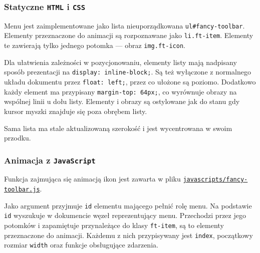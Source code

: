 \documentclass[10pt,a4paper]{article}
\newcommand{\f}[1]{\texttt{#1}}
\newcommand{\rev}{3b28a62c26319a36333406057e962ccbe1d4a198}
\newcommand{\revhref}[1] {\href{https://github.com/student-tomasz/pi-cwiczenie-2/blob/\rev/#1}{\f{#1}}}
\begin{document}
\subsubsection{Statyczne \f{HTML} i \f{CSS}}
Menu jest zaimplementowane jako lista nieuporządkowana \f{ul\#fancy-toolbar}.
Elementy przeznaczone do animacji są rozpoznawane jako \f{li.ft-item}. Elementy
te zawierają tylko jednego potomka --- obraz \f{img.ft-icon}.

Dla ułatwienia zależności w pozycjonowaniu, elementy listy mają nadpisany sposób
prezentacji na \f{display: inline-block;}. Są też wyłączone z normalnego układu
dokumentu przez \f{float: left;}, przez co ułożone są poziomo. Dodatkowo każdy
element ma przypisany \f{margin-top: 64px;}, co wyrównuje obrazy na wspólnej
linii u dołu listy. Elementy i obrazy są ostylowane jak do stanu gdy kursor
myszki znajduje się poza obrębem listy.

Sama lista ma stale aktualizowaną szerokość i jest wycentrowana w swoim przodku.

\subsubsection{Animacja z \f{JavaScript}}

Funkcja zajmująca się animacją ikon jest zawarta w pliku
\revhref{javascripts/fancy-toolbar.js}.

Jako argument przyjmuje \f{id} elementu mającego pełnić rolę menu. Na podstawie
\f{id} wyszukuje w dokumencie węzeł reprezentujący menu. Przechodzi przez jego
potomków i zapamiętuje przynależące do klasy \f{ft-item}, są to elementy
przeznaczone do animacji. Każdemu z nich przypisywany jest \f{index}, początkowy
rozmiar \f{width} oraz funkcje obsługujące zdarzenia.
\end{document}
